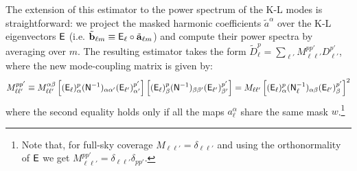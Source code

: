 \documentclass[twocolumn,amsfont,amssymb,amsmath, showpacs,balancelastpage, nofootinbib]{revtex4-1}
\begin{document}
  The extension of this estimator to the power spectrum of the K-L modes is straightforward: we project the masked harmonic coefficients $\tilde{a}^\alpha$ over the K-L eigenvectors ${\sf E}$ (i.e. $\tilde{\bf b}_{\ell m}\equiv {\sf E}_\ell\circ\tilde{\bf a}_{\ell m}$) and compute their power spectra by averaging over $m$. The resulting estimator takes the form $\tilde{D}^p_\ell=\sum_{\ell'}M_{\ell\ell'}^{pp'}D^{p'}_{\ell'}$, where the new mode-coupling matrix is given by:
  \begin{equation}
    M^{pp'}_{\ell\ell'}\equiv M^{\alpha\beta}_{\ell\ell'}\left[({\sf E}_\ell)^p_\alpha({\sf N}^{-1})_{\alpha\alpha'}({\sf E}_{\ell'})^{p'}_{\alpha'}\right]\left[({\sf E}_\ell)^p_\beta({\sf N}^{-1})_{\beta\beta'}({\sf E}_{\ell'})^{p'}_{\beta'}\right]
    =M_{\ell\ell'}\left[({\sf E}_\ell)^p_\alpha({\sf N}^{-1}_\ell)_{\alpha\beta}({\sf E}_{\ell'})^{p'}_\beta\right]^2
  \end{equation}
  where the second equality holds only if all the maps $a^\alpha_\ell$ share the same mask $w$.\footnote{Note that, for full-sky coverage $M_{\ell\ell'}=\delta_{\ell\ell'}$ and using the orthonormality of ${\sf E}$ we get $M^{pp'}_{\ell\ell'}=\delta_{\ell\ell'}\delta_{pp'}$.}
  
  \cite{2013arXiv1307.1307M,2015PhRvD..92l3010L}
\end{document}
